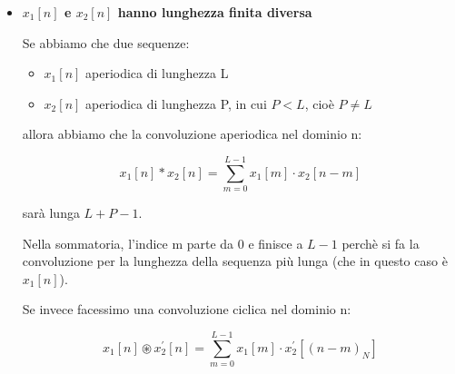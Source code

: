 \begin{itemize}
Per evitare aliasing, e che quindi non si sommano i contributi nella stessa finistra finita, 
possiamo svolgere uno zero padding alle due sequenze, affinche si arriva a sequenze di almeno $2N - 1$ punti. \newline 

Quindi una convoluzione aperiodica è uguale alla convoluzione ciclica se e solo se si svolge zero padding a $2 N - 1$ punti e si svolge una DFT a $2 N - 1$ punti. \newline

Questo è un altro vantaggio dello zero padding e della DFT 
perchè permette di calacolare la DTFT attraverso la DFT, in particolare grazie al prodotto delle due sequenze. \newline 

\newpage 

\item \textbf{$x_1 \left[ n \right]$ e $x_2 \left[ n \right]$ hanno lunghezza finita diversa} \newline 

Se abbiamo che due sequenze: 

\begin{itemize}
    \item $x_1 \left[ n\right]$ aperiodica di lunghezza L 
    \item $x_2 \left[ n\right]$ aperiodica di lunghezza P, in cui $P < L$, cioè $P \neq L$
\end{itemize}

allora abbiamo che la convoluzione aperiodica nel dominio n: 

{
    \Large 
    \begin{equation} 
        x_1 \left[ n \right]
        *
        x_2 \left[ n \right] 
        = 
        \sum_{m = 0}^{L - 1}
        x_1 \left[ m \right]
        \cdot 
        x_2 \left[ n - m \right]
    \end{equation}
}

sarà lunga $ L+ P - 1$. \newline 

Nella sommatoria, l'indice m parte da 0 e finisce a $L - 1$ perchè si fa la convoluzione per la lunghezza della sequenza più lunga (che in questo caso è $x_1 \left[ n\right]$). \newline 

Se invece facessimo una convoluzione ciclica nel dominio n: 

{
    \Large 
    \begin{equation} \label{eq: DFT tra due sequenze di lunghezza diversa}
        x_1 \left[ n \right]
        \circledast
        x_2^{'} \left[ n \right]
        = 
        \sum_{m = 0}^{L - 1}
        x_1 \left[ m \right]
        \cdot 
        x_2^{'} \left[ \left(n - m \right)_{N} \right]
    \end{equation}
}


\end{itemize}
